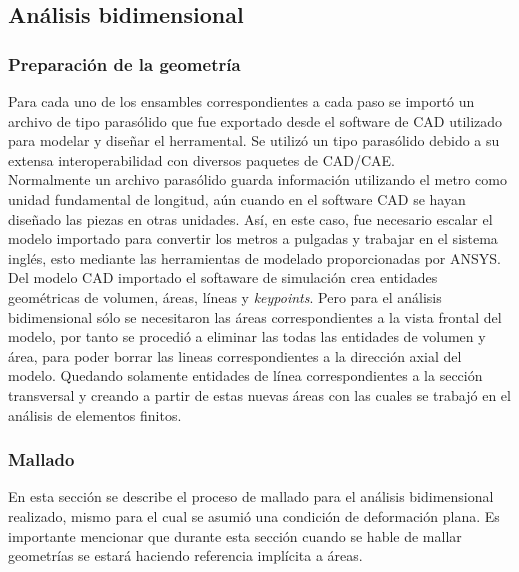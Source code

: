 \subsection{Análisis bidimensional}

\subsubsection{Preparación de la geometría}

Para cada uno de los ensambles correspondientes a cada paso se importó un archivo de tipo parasólido 
que fue exportado desde el software de CAD utilizado para modelar y diseñar el herramental. Se utilizó 
un tipo parasólido debido a su extensa interoperabilidad con diversos paquetes de CAD/CAE. ~\cite{parasolid-reference} \\

Normalmente un archivo parasólido guarda información utilizando el metro como unidad fundamental 
de longitud, aún cuando en el software CAD se hayan diseñado las piezas en otras unidades. 
Así, en este caso, fue necesario escalar el modelo importado para convertir los metros a pulgadas 
y trabajar en el sistema inglés, esto mediante las herramientas de modelado proporcionadas por 
ANSYS\CR. \\

Del modelo CAD importado el softaware de simulación crea entidades geométricas de volumen, áreas, 
líneas y \textit{keypoints}. Pero para el análisis bidimensional sólo se necesitaron las áreas 
correspondientes a la vista frontal del modelo, por tanto se procedió a eliminar las todas las entidades 
de volumen y área, para poder borrar las lineas correspondientes a la dirección axial del modelo.
Quedando solamente entidades de línea correspondientes a la sección transversal y creando  
a partir de estas nuevas áreas con las cuales se trabajó en el análisis de elementos finitos.


\subsubsection{Mallado}

En esta sección se describe el proceso de mallado para el análisis bidimensional realizado, 
mismo para el cual se asumió una condición de deformación plana. Es importante mencionar 
que durante esta sección cuando se hable de mallar geometrías se estará haciendo referencia 
implícita a áreas.\\

